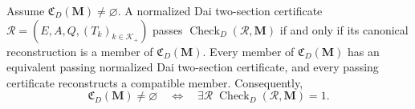 Assume \(\mathfrak C_D(\mathbf M)\ne\varnothing\).  A normalized Dai two-section certificate \(\mathcal R=(E,A,Q,(T_k)_{k\in\mathcal K_+})\) passes \(\operatorname{Check}_{D}(\mathcal R,\mathbf M)\) if and only if its canonical reconstruction is a member of \(\mathfrak C_D(\mathbf M)\).  Every member of \(\mathfrak C_D(\mathbf M)\) has an equivalent passing normalized Dai two-section certificate, and every passing certificate reconstructs a compatible member.  Consequently,
\[
\mathfrak C_D(\mathbf M)\ne\varnothing
\quad\Longleftrightarrow\quad
\exists\mathcal R\;\operatorname{Check}_{D}(\mathcal R,\mathbf M)=1.
\]